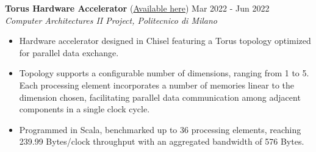 
\noindent
\textbf{Torus Hardware Accelerator} (\href{https://github.com/GiuseppeCalderonio/HPPS_Project}{Available here})  \hfill Mar 2022 - Jun 2022 \\
\textit{Computer Architectures II Project, Politecnico di Milano}
\begin{itemize}[noitemsep,topsep=0pt]
    \item Hardware accelerator designed in Chisel featuring a Torus topology optimized for parallel data exchange.
    \item Topology supports a configurable number of dimensions, ranging from 1 to 5. Each processing element incorporates a number of memories linear to the dimension chosen, facilitating parallel data communication among adjacent components in a single clock cycle.
    \item Programmed in Scala, benchmarked up to 36 processing elements, reaching 239.99 Bytes/clock throughput with an aggregated bandwidth of 576 Bytes.

\end{itemize}

